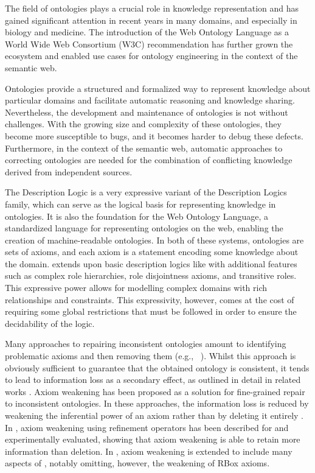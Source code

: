 
The field of ontologies plays a crucial role in knowledge representation and has gained significant attention in recent years in many domains, and especially in biology and medicine. The introduction of the Web Ontology Language as a World Wide Web Consortium (W3C) recommendation has further grown the ecosystem and enabled use cases for ontology engineering in the context of the semantic web.

Ontologies provide a structured and formalized way to represent knowledge about particular domains and facilitate automatic reasoning and knowledge sharing. Nevertheless, the development and maintenance of ontologies is not without challenges. With the growing size and complexity of these ontologies, they become more susceptible to bugs, and it becomes harder to debug these defects. Furthermore, in the context of the semantic web, automatic approaches to correcting ontologies are needed for the combination of conflicting knowledge derived from independent sources.

The \SROIQ Description Logic is a very expressive variant of the Description Logics family, which can serve as the logical basis for representing knowledge in ontologies. It is also the foundation for the Web Ontology Language, a standardized language for representing ontologies on the web, enabling the creation of machine-readable ontologies. In both of these systems, ontologies are sets of axioms, and each axiom is a statement encoding some knowledge about the domain. \SROIQ extends upon basic description logics like \ALC with additional features such as complex role hierarchies, role disjointness axioms, and transitive roles. This expressive power allows for modelling complex domains with rich relationships and constraints. This expressivity, however, comes at the cost of requiring some global restrictions that must be followed in order to ensure the decidability of the logic.

Many approaches to repairing inconsistent ontologies amount to identifying problematic axioms and then removing them (e.g., ~\cite{schlobach2003non,kalyanpur2005debugging,kalyanpur2006repairing,BaPS07}). Whilst this approach is obviously sufficient to guarantee that the obtained ontology is consistent, it tends to lead to information loss as a secondary effect, as outlined in detail in related works \cite{troquard2018repairing,confalonieri2020towards}. 
Axiom weakening has been proposed as a solution for fine-grained repair to inconsistent ontologies. In these approaches, the information loss is reduced by weakening the inferential power of an axiom rather than by deleting it entirely \cite{du2014practical,AMAI-2018,baader2018making,troquard2018repairing,confalonieri2020towards}. 
%
In \cite{troquard2018repairing}, axiom weakening using refinement operators has been described for \ALC and experimentally evaluated, showing that axiom weakening is able to retain more information than deletion. In \cite{confalonieri2020towards}, axiom weakening is extended to include many aspects of \SROIQ, notably omitting, however, the weakening of RBox axioms.

